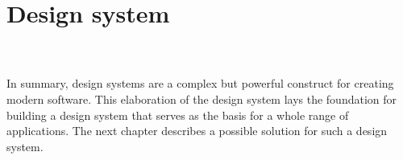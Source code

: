 \newpage
\section{Design system}\label{design_systems}

%
\\
\\
In summary, design systems are a complex but powerful construct for creating modern software. This elaboration of the design system lays the foundation for building a design system that serves as the basis for a whole range of applications. The next chapter describes a possible solution for such a design system.